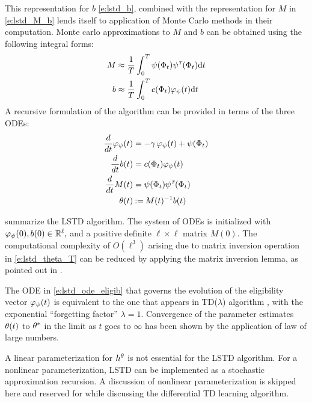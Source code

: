 This representation for $b$ \eqref{e:lstd_b}, combined with the representation for $M$ in \eqref{e:lstd_M_b} lends itself to application of Monte Carlo methods in their computation. Monte carlo approximations to $M$ and $b$ can be obtained using the following integral forms:
\begin{subequations}
\begin{align}
M &\approx \frac{1}{T} \int_0^T  \basis(\markovstate_t) \basis^\transpose(\markovstate_t) \ud t
\label{e:lstd_M_T}
\\
b & \approx  \frac{1}{T} \int_0^T c(\markovstate_t) \eligibvector_\basis(t) \ud t
\label{e:lstd_b_T}
\end{align}
\end{subequations}
A recursive formulation of the algorithm can be provided in terms of the three ODEs:
\begin{subequations}
\begin{align}
\ddt \eligibvector_\basis (t) &= - \discount\, \eligibvector_\basis(t) + \basis (\markovstate_t) 
\label{e:lstd_ode_eligib} \\
\ddt b(t) &=  c(\markovstate_t)\eligibvector_\basis(t)
 \label{e:lstd_ode_b}\\
\ddt M(t) &= \basis(\markovstate_t) \basis^\transpose(\markovstate_t) 
\label{e:lstd_ode_M} \\
\param(t) &\eqdef  M(t)^{-1} b(t)
\label{e:lstd_theta_T}
\end{align}
\end{subequations}

 summarize the LSTD algorithm. The system of ODEs is initialized with $\varphi_\psi(0), b(0) \in \mathbb{R}^\ell,$ and a positive definite $\ell \times \ell$ matrix $M(0)$. The computational complexity of $O(\ell^3)$ arising due to matrix inversion operation in \eqref{e:lstd_theta_T} can be reduced by applying the matrix inversion lemma, as pointed out in \cite{ctcn}. 

The ODE in \eqref{e:lstd_ode_eligib} that governs the evolution of the eligibility vector $\varphi_\psi(t)$ is equivalent to the one that appears in TD($\lambda$) algorithm \cite{sut88}, with the exponential ``forgetting factor'' $\lambda = 1$. Convergence of the parameter estimates $\theta(t)$ to $\theta^*$ in the limit as $t$ goes to $\infty$ has been shown by the application of law of large numbers. %

A linear parameterization for $h^\theta$ is not essential for the LSTD algorithm. For a nonlinear parameterization,  LSTD can be implemented as a stochastic approximation recursion. A discussion of nonlinear parameterization is skipped here and reserved for  while discussing the differential TD learning algorithm. 

